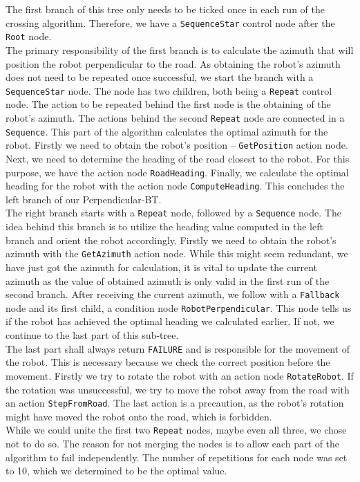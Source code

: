     The first branch of this tree only needs to be ticked once in each run of the crossing algorithm. Therefore, we have a \texttt{SequenceStar} control node after the \texttt{Root} node.\\
    The primary responsibility of the first branch is to calculate the azimuth that will position the robot perpendicular to the road. As obtaining the robot's azimuth does not need to be repeated once successful, we start the branch with a \texttt{SequenceStar} node. The node has two children, both being a \texttt{Repeat} control node. The action to be repeated behind the first node is the obtaining of the robot's azimuth. The actions behind the second \texttt{Repeat} node are connected in a \texttt{Sequence}. This part of the algorithm calculates the optimal azimuth for the robot. Firstly we need to obtain the robot's position -- \texttt{GetPosition} action node. Next, we need to determine the heading of the road closest to the robot. For this purpose, we have the action node \texttt{RoadHeading}. Finally, we calculate the optimal heading for the robot with the action node \texttt{ComputeHeading}. This concludes the left branch of our Perpendicular-BT.\\
    The right branch starts with a \texttt{Repeat} node, followed by a \texttt{Sequence} node. The idea behind this branch is to utilize the heading value computed in the left branch and orient the robot accordingly. Firstly we need to obtain the robot's azimuth with the \texttt{GetAzimuth} action node. While this might seem redundant, we have just got the azimuth for calculation, it is vital to update the current azimuth as the value of obtained azimuth is only valid in the first run of the second branch. After receiving the current azimuth, we follow with a \texttt{Fallback} node and its first child, a condition node \texttt{RobotPerpendicular}. This node tells us if the robot has achieved the optimal heading we calculated earlier. If not, we continue to the last part of this sub-tree.\\
    The last part shall always return \texttt{FAILURE} and is responsible for the movement of the robot. This is necessary because we check the correct position before the movement. Firstly we try to rotate the robot with an action node \texttt{RotateRobot}. If the rotation was unsuccessful, we try to move the robot away from the road with an action \texttt{StepFromRoad}. The last action is a precaution, as the robot's rotation might have moved the robot onto the road, which is forbidden.\\
    While we could unite the first two \texttt{Repeat} nodes, maybe even all three, we chose not to do so. The reason for not merging the nodes is to allow each part of the algorithm to fail independently. The number of repetitions for each node was set to 10, which we determined to be the optimal value.

